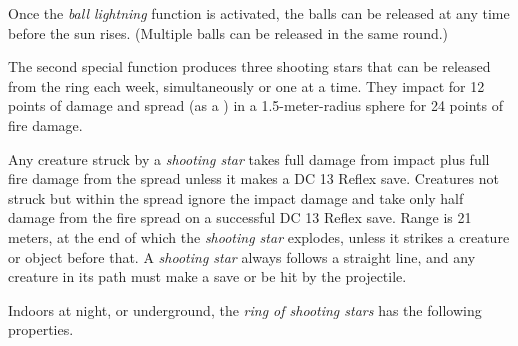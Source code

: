 
Once the \emph{ball lightning} function is activated, the balls can be released at any time before the sun rises. (Multiple balls can be released in the same round.)

The second special function produces three shooting stars that can be released from the ring each week, simultaneously or one at a time. They impact for 12 points of damage and spread (as a ) in a 1.5-meter-radius sphere for 24 points of fire damage.

Any creature struck by a \emph{shooting star} takes full damage from impact plus full fire damage from the spread unless it makes a DC 13 Reflex save. Creatures not struck but within the spread ignore the impact damage and take only half damage from the fire spread on a successful DC 13 Reflex save. Range is 21 meters, at the end of which the \emph{shooting star} explodes, unless it strikes a creature or object before that. A \emph{shooting star} always follows a straight line, and any creature in its path must make a save or be hit by the projectile.

Indoors at night, or underground, the \emph{ring of shooting stars} has the following properties.

